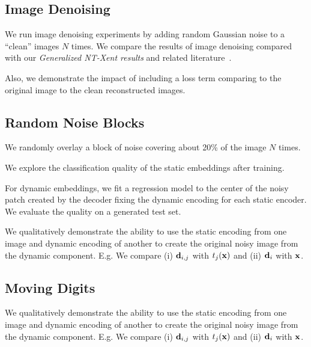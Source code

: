 \documentclass[11pt]{article}
\begin{document}
\subsection{Image Denoising}\label{subsec:disent_mnist_denoising}

We run image denoising experiments by adding random Gaussian noise to a ``clean'' images $N$ times. We compare the results of image denoising compared with our \emph{Generalized NT-Xent results} and related literature~\cite{xia2019training,metzler2016denoising,li2013efficient}.

Also, we demonstrate the impact of including a loss term comparing to the original image to the clean reconstructed images.

\subsection{Random Noise Blocks}\label{subsec:disent_mnist_noise_block}

We randomly overlay a block of noise covering about 20\% of the image $N$ times. 

We explore the classification quality of the static embeddings after training.

For dynamic embeddings, we fit a regression model to the center of the noisy patch created by the decoder fixing the dynamic encoding  for each static encoder. We evaluate the quality on a generated test set.

We qualitatively demonstrate the ability to use the static encoding from one image and dynamic encoding of another to create the original noisy image from the dynamic component. E.g. We compare (i) $\boldsymbol{\mathrm{d}}_{i,j}$ with $t_j(\boldsymbol{\mathrm{x}})$ and (ii) $\boldsymbol{\mathrm{d}}_{i}$ with $\boldsymbol{\mathrm{x}}$.

\subsection{Moving Digits}\label{subsec:disent_mnist_motion}

We qualitatively demonstrate the ability to use the static encoding from one image and dynamic encoding of another to create the original noisy image from the dynamic component. E.g. We compare (i) $\boldsymbol{\mathrm{d}}_{i,j}$ with $t_j(\boldsymbol{\mathrm{x}})$ and (ii) $\boldsymbol{\mathrm{d}}_{i}$ with $\boldsymbol{\mathrm{x}}$.


\newpage



\end{document}
